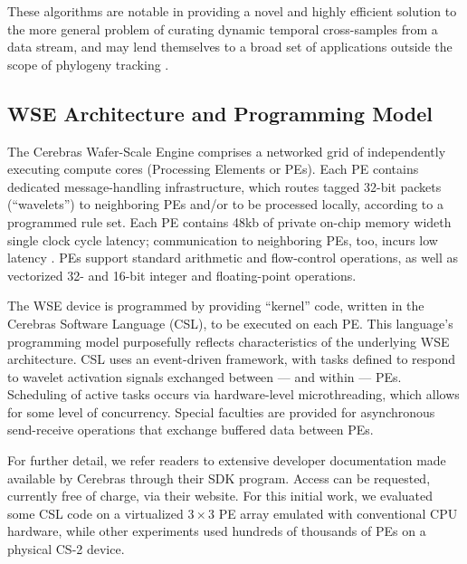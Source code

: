 These algorithms are notable in providing a novel and highly efficient solution to the more general problem of curating dynamic temporal cross-samples from a data stream, and may lend themselves to a broad set of applications outside the scope of phylogeny tracking \citep{moreno2024algorithms}.




\subsection{WSE Architecture and Programming Model}

The Cerebras Wafer-Scale Engine comprises a networked grid of independently executing compute cores (Processing Elements or PEs).
Each PE contains dedicated message-handling infrastructure, which routes tagged 32-bit packets (``wavelets'') to neighboring PEs and/or to be processed locally, according to a programmed rule set.
Each PE contains 48kb of private on-chip memory wideth single clock cycle latency;
communication to neighboring PEs, too, incurs low latency \citep{buitrago2021neocortex}.
PEs support standard arithmetic and flow-control operations, as well as vectorized 32- and 16-bit integer and floating-point operations.

The WSE device is programmed by providing ``kernel'' code, written in the Cerebras Software Language (CSL), to be executed on each PE.
This language's programming model purposefully reflects characteristics of the underlying WSE architecture.
CSL uses an event-driven framework, with tasks defined to respond to wavelet activation signals exchanged between --- and within --- PEs.
Scheduling of active tasks occurs via hardware-level microthreading, which allows for some level of concurrency.
Special faculties are provided for asynchronous send-receive operations that exchange buffered data between PEs.

For further detail, we refer readers to extensive developer documentation made available by Cerebras through their SDK program.
Access can be requested, currently free of charge, via their website.
For this initial work, we evaluated some CSL code on a virtualized $3\times3$ PE array emulated with conventional CPU hardware, while other experiments used hundreds of thousands of PEs on a physical CS-2 device.

